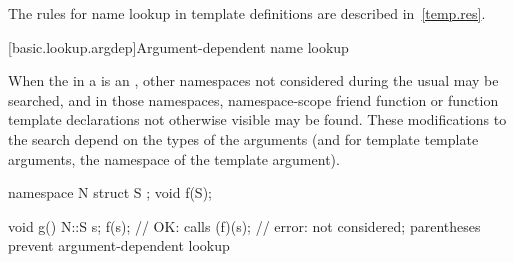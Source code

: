 \pnum
\begin{note}
The rules for name lookup in template definitions are
described in~\ref{temp.res}.
\end{note}

[basic.lookup.argdep]{Argument-dependent name lookup}%

\pnum
When the  in
a  is an , other namespaces not considered
during the usual  may be
searched, and in those namespaces, namespace-scope friend function or
function template declarations not otherwise
visible may be found.
These modifications to the search depend on the types of the arguments
(and for template template arguments, the namespace of the template
argument).
\begin{example}
\begin{codeblock}
namespace N {
  struct S { };
  void f(S);
}

void g() {
  N::S s;
  f(s);     // OK: calls 
  (f)(s);   // error:  not considered; parentheses prevent argument-dependent lookup
}
\end{codeblock}
\end{example}

